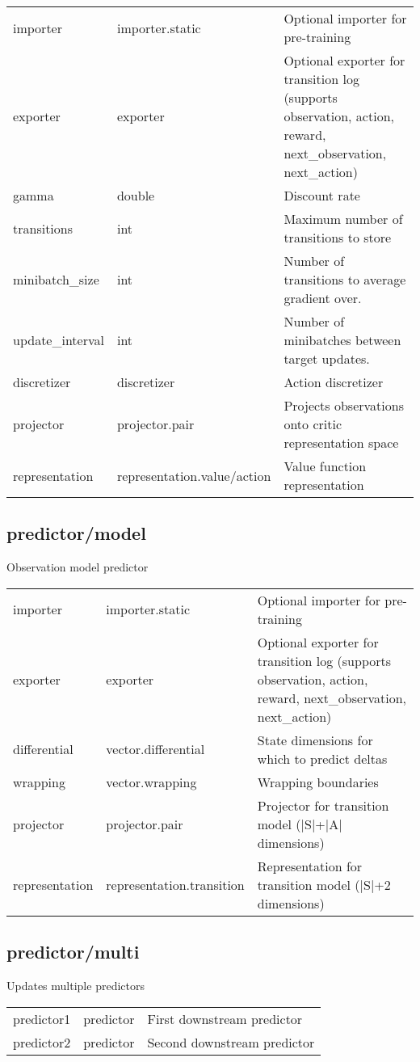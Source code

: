 \noindent\begin{tabular}{@{}lll@{}}
importer&importer.static&Optional importer for pre-training\\
exporter&exporter&Optional exporter for transition log (supports observation, action, reward, next\_observation, next\_action)\\
gamma&double&Discount rate\\
transitions&int&Maximum number of transitions to store\\
minibatch\_size&int&Number of transitions to average gradient over.\\
update\_interval&int&Number of minibatches between target updates.\\
discretizer&discretizer&Action discretizer\\
projector&projector.pair&Projects observations onto critic representation space\\
representation&representation.value/action&Value function representation\\
\end{tabular}
\subsection{predictor/model}
\noindent Observation model predictor\\

\noindent\begin{tabular}{@{}lll@{}}
importer&importer.static&Optional importer for pre-training\\
exporter&exporter&Optional exporter for transition log (supports observation, action, reward, next\_observation, next\_action)\\
differential&vector.differential&State dimensions for which to predict deltas\\
wrapping&vector.wrapping&Wrapping boundaries\\
projector&projector.pair&Projector for transition model (|S|+|A| dimensions)\\
representation&representation.transition&Representation for transition model (|S|+2 dimensions)\\
\end{tabular}
\subsection{predictor/multi}
\noindent Updates multiple predictors\\

\noindent\begin{tabular}{@{}lll@{}}
predictor1&predictor&First downstream predictor\\
predictor2&predictor&Second downstream predictor\\
\end{tabular}
